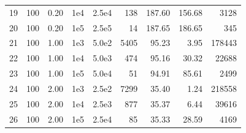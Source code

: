 \documentclass[11pt]{article}
\begin{document}
\begin{table}
\begin{center}
\begin{tabular}{lrrrrrrrr}
19 &    100 &  0.20 &   1e4 &  2.5e4 &    138 &     187.60 &   156.68  &  3128   \\
20 &    100 &  0.20 &   1e5 &  2.5e5 &     14 &     187.65 &   186.65  &  345   \\
21 &    100 &  1.00 &   1e3 &  5.0e2 &   5405 &      95.23 &     3.95  &  178443   \\
22 &    100 &  1.00 &   1e4 &  5.0e3 &    474 &      95.16 &    30.32  &  22688  \\
23 &    100 &  1.00 &   1e5 &  5.0e4 &     51 &      94.91 &    85.61  &  2499   \\
24 &    100 &  2.00 &   1e3 &  2.5e2 &   7299 &      35.40 &     1.24  &  218558   \\
25 &    100 &  2.00 &   1e4 &  2.5e3 &    877 &      35.37 &     6.44  &  39616   \\
26 &    100 &  2.00 &   1e5 &  2.5e4 &     85 &      35.33 &    28.59  &  4169   \\
\bottomrule
\end{tabular}



\end{center}
\end{table}
\end{document}
